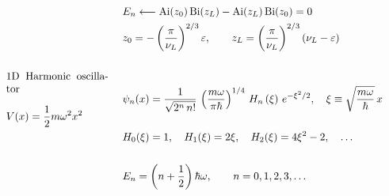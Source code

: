 \documentclass{article}[a4paper]
\begin{document}
\begin{minipage}[t]{0.5\textwidth}
\begin{align*}
    &&&\\
    && ~&E_n \longleftarrow \mathrm{Ai}(z_0) \, \mathrm{Bi}(z_L) - \mathrm{Ai}(z_L) \, \mathrm{Bi}(z_0) = 0\\
    && ~&z_0 = - \left(\frac{\pi}{\nu_L}\right)^{2/3} \varepsilon, \qquad z_L = \left(\frac{\pi}{\nu_L}\right)^{2/3} \left(\nu_L - \varepsilon\right)
    &&&\\
    &&&\\
    &\textrm{\parbox{0.28\textwidth}{1D Harmonic oscillator \\~\\ $V(x) = \frac{1}{2} m\omega^2 x^2$}} & ~&\psi_n(x) = \frac{1}{\sqrt{2^n \, n!}} \, \left(\frac{m\omega}{\pi \hbar}\right)^{1/4} \, H_n\left(\xi\right) \, e^{-\xi^2/2}, \quad \xi \equiv \sqrt{\frac{m\omega}{\hbar}} \,x\\
    && ~&H_0(\xi) = 1, \quad H_1(\xi) = 2\xi, \quad H_2(\xi) = 4\xi^2-2,\quad\dots  \\
    &&&\\
    && ~&E_n = \left(n + \frac{1}{2}\right) \hbar\omega, \qquad n = 0, 1, 2, 3, \dots\\
  \end{align*}
\end{minipage}%
%
%
\end{document}
